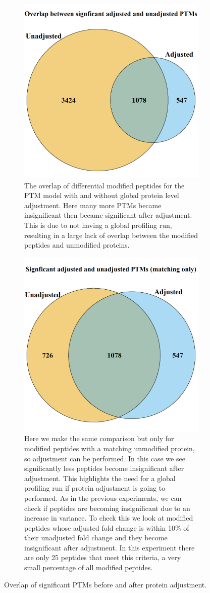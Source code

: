 \documentclass{mcp}
\begin{document}
\begin{figure}[h!]
\centering
 \begin{subfigure}{\textwidth}
 \centering
	\includegraphics[height=.5\textwidth]{sim_new/usp30_venn_diagramm}
	\caption{The overlap of differential modified peptides for the PTM model with and without global protein level adjustment. Here many more PTMs became insignificant then became significant after adjustment. This is due to not having a global profiling run, resulting in a large lack of overlap between the modified peptides and unmodified proteins.}
 \end{subfigure}\vspace{-5mm}
 \begin{subfigure}{\textwidth}
 \centering
	\includegraphics[height=.5\textwidth]{sim_new/usp30_venn_diagramm_matching_only}
	\caption{Here we make the same comparison but only for modified peptides with a matching unmodified protein, so adjustment can be performed. In this case we see significantly less peptides become insignificant after adjustment. This highlights the need for a global profiling run if protein adjustment is going to performed. As in the previous experiments, we can check if peptides are becoming insignificant due to an increase in variance. To check this we look at modified peptides whose adjusted fold change is within 10\% of their unadjusted fold change and they become insignificant after adjustment. In this experiment there are only 25 peptides that meet this criteria, a very small percentage of all modified peptides.}
 \end{subfigure}
 \caption{Overlap of significant PTMs before and after protein adjustment.}
\label{fig:usp30_ven_d}
\end{figure}
\end{document}
